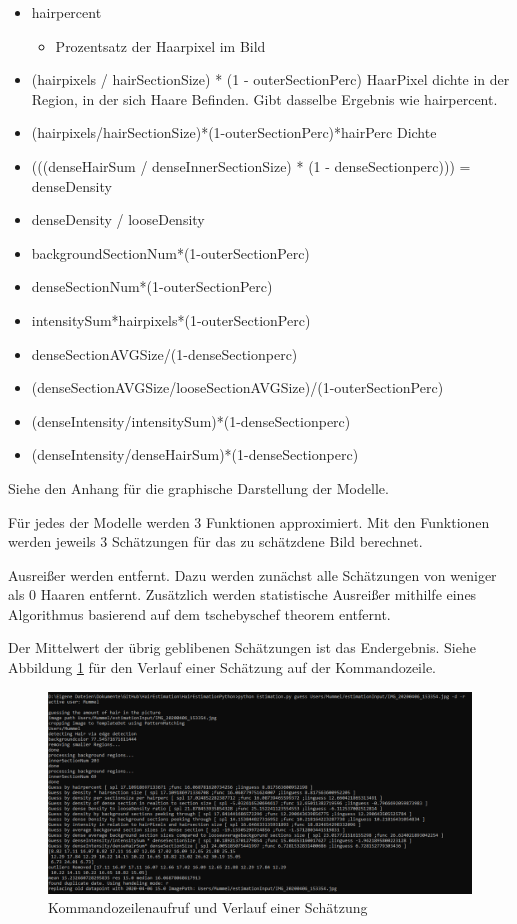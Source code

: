 \documentclass[german,a4paper, 12pt]{scrartcl}
\begin{document}
\begin{itemize}
	\item hairpercent 
	\begin{itemize}
		\item Prozentsatz der Haarpixel im Bild
	\end{itemize}
	\item (hairpixels / hairSectionSize) * (1 - outerSectionPerc)
	HaarPixel dichte in der Region, in der sich Haare Befinden. Gibt dasselbe Ergebnis wie hairpercent.
	\item (hairpixels/hairSectionSize)*(1-outerSectionPerc)*hairPerc
	Dichte 
	
	\item (((denseHairSum / denseInnerSectionSize) * (1 - denseSectionperc))) = denseDensity
	\item denseDensity / looseDensity
	\item backgroundSectionNum*(1-outerSectionPerc)
	\item denseSectionNum*(1-outerSectionPerc)
	\item intensitySum*hairpixels*(1-outerSectionPerc)
	\item denseSectionAVGSize/(1-denseSectionperc)
	\item (denseSectionAVGSize/looseSectionAVGSize)/(1-outerSectionPerc)
	\item (denseIntensity/intensitySum)*(1-denseSectionperc)
	\item (denseIntensity/denseHairSum)*(1-denseSectionperc)
\end{itemize}

Siehe den Anhang für die graphische Darstellung der Modelle.

Für jedes der Modelle werden 3 Funktionen approximiert. Mit den Funktionen werden jeweils 3 Schätzungen für das zu schätzdene Bild berechnet. 

Ausreißer werden entfernt. Dazu werden zunächst alle Schätzungen von weniger als 0 Haaren entfernt. Zusätzlich werden statistische Ausreißer mithilfe eines Algorithmus basierend auf dem tschebyschef theorem entfernt. 

Der Mittelwert der übrig geblibenen Schätzungen ist das Endergebnis. 
Siehe Abbildung \ref{img:guess} für den Verlauf einer Schätzung auf der Kommandozeile.

\begin{figure}
  \centering
  \includegraphics[width=1\textwidth]{fig64/commandlineGuessProcess.PNG}
  \caption[]{Kommandozeilenaufruf und Verlauf einer Schätzung}
  \label{img:guess}
\end{figure} 
\end{document}
